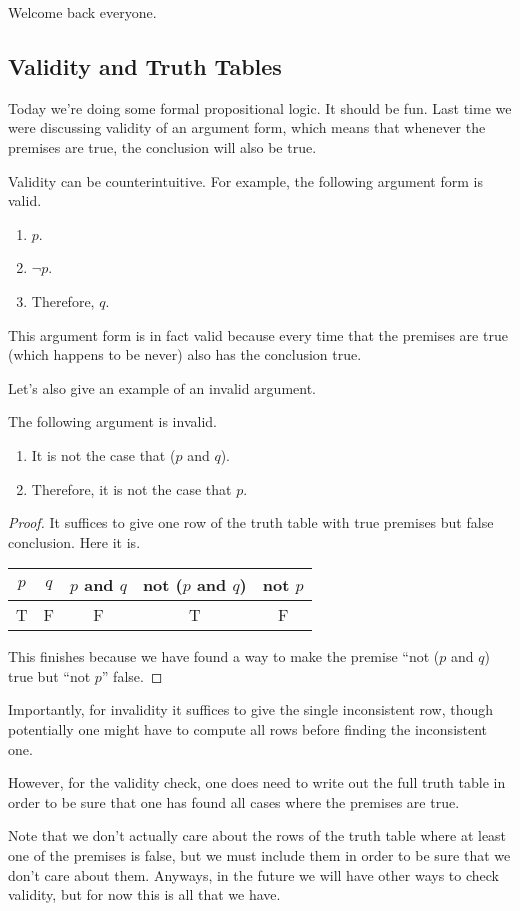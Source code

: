 
Welcome back everyone.

\subsection{Validity and Truth Tables}
Today we're doing some formal propositional logic. It should be fun. Last time we were discussing validity of an argument form, which means that whenever the premises are true, the conclusion will also be true.
\begin{ex}
	Validity can be counterintuitive. For example, the following argument form is valid.
	\begin{enumerate}
		\item $p$.
		\item $\lnot p$.
		\item Therefore, $q$.
	\end{enumerate}
	This argument form is in fact valid because every time that the premises are true (which happens to be never) also has the conclusion true.
\end{ex}
Let's also give an example of an invalid argument.
\begin{exe}
	The following argument is invalid.
	\begin{enumerate}
		\item It is not the case that ($p$ and $q$).
		\item Therefore, it is not the case that $p$.
	\end{enumerate}
\end{exe}
\begin{proof}
	It suffices to give one row of the truth table with true premises but false conclusion. Here it is.
	\begin{center}
		\begin{tabular}{c|c||c|c||c}
			$p$ & $q$ & $p$ and $q$ & not ($p$ and $q$) & not $p$ \\\hline
			T & F & F & T & F
		\end{tabular}
	\end{center}
	This finishes because we have found a way to make the premise ``not ($p$ and $q$) true but ``not $p$'' false.
\end{proof}
Importantly, for invalidity it suffices to give the single inconsistent row, though potentially one might have to compute all rows before finding the inconsistent one.
\begin{warn}
	However, for the validity check, one does need to write out the full truth table in order to be sure that one has found all cases where the premises are true.
\end{warn}
Note that we don't actually care about the rows of the truth table where at least one of the premises is false, but we must include them in order to be sure that we don't care about them. Anyways, in the future we will have other ways to check validity, but for now this is all that we have.

